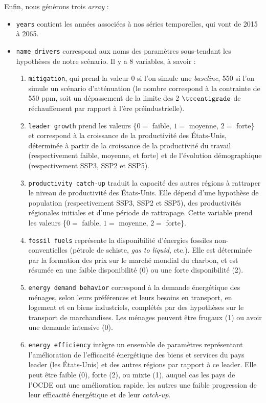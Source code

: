 \documentclass[a4,11pt]{aleph-notas}
\begin{document}
Enfin, nous générons trois \textit{array} : 
\begin{itemize}
\item \texttt{years} contient les années associées à nos séries temporelles, qui vont de 2015 à 2065. 
\item \texttt{name\_drivers} correspond aux noms des paramètres sous-tendant les hypothèses de notre scénario. Il y a 8 variables, à savoir : 
\begin{enumerate}
    \item \texttt{mitigation}, qui prend la valeur 0 si l'on simule une \textit{baseline}, 550 si l'on simule un scénario d'atténuation (le nombre correspond à la contrainte de 550 ppm, soit un dépassement de la limite des 2 $\tccentigrade$ de réchauffement par rapport à l'ère préindustrielle). 
    \item \texttt{leader growth} prend les valeurs \{$0 =$ faible, $1 =$ moyenne, $2 =$ forte\} et correspond à la croissance de la productivité des États-Unis, déterminée à partir de la croissance de la productivité du travail (respectivement faible, moyenne, et forte) et de l'évolution démographique (respectivement SSP3, SSP2 et SSP5).
    \item \texttt{productivity catch-up} traduit la capacité des autres régions à rattraper le niveau de productivité des États-Unis. Elle dépend d'une hypothèse de population (respectivement SSP3, SSP2 et SSP5), des productivités régionales initiales et d'une période de rattrapage. Cette variable prend les valeurs \{$0 =$ faible, $1 =$ moyenne, $2 =$ forte\}.
    \item \texttt{fossil fuels} représente la disponibilité d'énergies fossiles non-conventielles (pétrole de schiste, \textit{gas to liquid}, etc.). Elle est déterminée par la formation des prix sur le marché mondial du charbon, et est résumée en une faible disponibilité (0) ou une forte disponibilité (2).
    \item \texttt{energy demand behavior} correspond à la demande énergétique des ménages, selon leurs préférences et leurs besoins en transport, en logement et en biens industriels, complétés par des hypothèses sur le transport de marchandises. Les ménages peuvent être frugaux (1) ou avoir une demande intensive (0).
    \item \texttt{energy efficiency} intègre un ensemble de paramètres représentant l'amélioration de l'efficacité énergétique des biens et services du pays leader (les États-Unis) et des autres régions par rapport à ce leader. Elle peut être faible (0), forte (2), ou mixte (1), auquel cas les pays de l'OCDE ont une amélioration rapide, les autres une faible progression de leur efficacité énergétique et de leur \textit{catch-up}. 

\end{enumerate}
\end{itemize}
\end{document}
